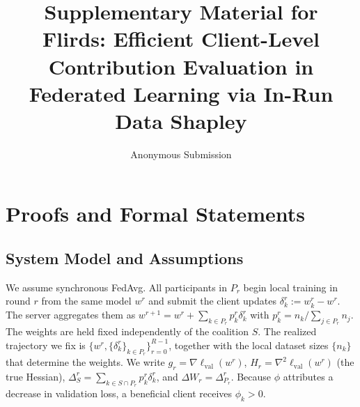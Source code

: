 \documentclass[letterpaper]{article} %
\title{Supplementary Material for\\Flirds: Efficient Client-Level Contribution Evaluation in Federated Learning via In-Run Data Shapley}
\author{
    Anonymous Submission
}
\providecommand{\lval}{\ell_{\mathrm{val}}}
\theoremstyle{definition}
\begin{document}
\maketitle
\appendix

\setcounter{table}{0}
\renewcommand{\thetable}{S\arabic{table}}

\section{Proofs and Formal Statements}
\label{app:proofs}


\subsection{System Model and Assumptions}
\label{app:model}

We assume synchronous FedAvg. All participants in $P_r$ begin local training
in round $r$ from the same model $w^r$ and submit the client updates
$\delta_k^r := w_k^r - w^r$. The server aggregates them as
$w^{r+1} = w^r + \sum_{k \in P_r} p_k^r \delta_k^r$ with
$p_k^r = n_k / \sum_{j \in P_r} n_j$. The weights are held fixed
independently of the coalition $S$. The realized trajectory we fix is
$\{w^r, \{\delta_k^r\}_{k \in P_r}\}_{r=0}^{R-1}$, together with the local
dataset sizes $\{n_k\}$ that determine the weights. We write
$g_r = \nabla\lval(w^r)$, $H_r = \nabla^2\lval(w^r)$ (the true Hessian),
$\Delta_S^r = \sum_{k \in S \cap P_r} p_k^r \delta_k^r$, and
$\Delta W_r = \Delta_{P_r}^r$. Because $\phi$ attributes a decrease in
validation loss, a beneficial client receives $\phi_k > 0$.
\end{document}
